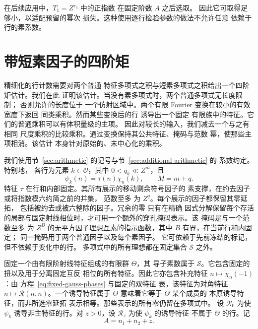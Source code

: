 \documentclass[11pt,a4paper]{article}
\numberwithin{equation}{section}
\numberwithin{figure}{section}
\theoremstyle{definition}
\theoremstyle{remark}
\begin{document}
在后续应用中，\(T_1=Z^{\tau_\eta}\) 中的正指数
在固定阶数 \(A\) 之后选取。
因此它可取得足够小，以适配预留的幂次
损失。这种使用逐行检验参数的做法不允许任意
依赖于行的素系数。

\section{带短素因子的四阶矩}\label{sec:plain}

精细化的行计数需要对两个普通
特征多项式之积与短素多项式之积给出一个四阶矩估计。我们在此
证明该估计。当没有素多项式时，两个普通多项式无长度限制；
否则允许的长度位于
一个仿射区域中。两个有限 Fourier 变换在较小的有效宽度下返回
同类乘积。然而某些变换后的行
诱导出一个固定
有限族中的特征。它们的普通乘积可以有体积量级的主项。
因此对较长的输入，我们减去一个与之有相同
尺度乘积的比较乘积。通过变换保持其公共特征、掩码与范数
幂，使那些主项相消。该估计
本身针对原始的、未中心化的乘积。

我们使用节~\ref{sec:arithmetic} 的记号与节~\ref{sec:additional-arithmetic} 的
系数约定。特别地，
各行为元素 \(k\in\mathcal O\)，其中 \(0<q_k\ll Z^m\)，且
\[
 \psi_k(n)=\tau(n)\chi_n(k),\qquad M=m+q.
\]
特征 \(\tau\) 在行和内部固定。其所有展示的移动剩余符号因子的
素支撑，在约去因子或将指数模六约简之前的并集，
范数至多
为 \(Z^q\)。每个展示的因子都保留其零延拓，
包括被约去或被六整除的因子。冗余的零
只有在精确
因式分解保留每个存活的局部与固定射线相位时，才可用一个额外的穿孔掩码表示。该
掩码是与一个范数至多
为 \(Z^B\) 的无平方因子理想互素的指示函数，其中 \(B\) 有界，在当前行和内固定；
同一掩码用于两个普通因子以及每个素因子。
它可依赖于先前冻结的标记，但不依赖于变化中的行。
多项式中的所有理想都在固定集合 \(\mathcal S\) 之外。

固定一个由有限阶射线特征组成的有限群 \(\Theta\)，其
导子素数属于 \(\mathcal S\)。它包含固定的
扭以及用于分离固定互反
相位的所有特征。因此它亦包含补充特征
\(n\mapsto\chi_n(-1)\)：由
方程~\eqref{eq:fixed-gauss-phases} 与固定的双特征
表，该特征为对角特征
\(n\mapsto\mathcal R(n,n)\)。一个诱导特征属于
\(\Theta\) 意味着它等于 \(\Theta\) 某个成员的
本原诱导特征，而非所选零延拓
表示相等。那些表示的所有零仍留在多项式中。
设 \(\mathcal R_0\) 为使
\(\psi_k\) 诱导非主特征的行。对 \(z>0\)，设
\(\mathcal R_z\) 为使 \(\psi_k\) 的诱导特征
不属于 \(\Theta\) 的行。记
\begin{equation}
 A=n_1+n_2+z.
 \label{old-eq:3.1}
\end{equation}
\end{document}
